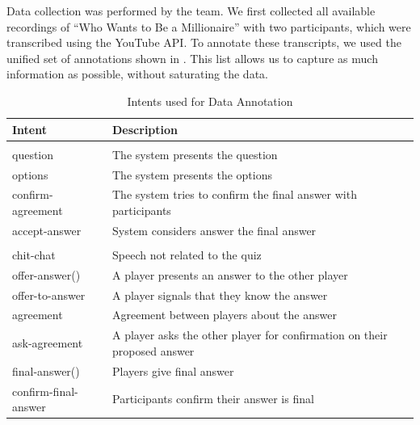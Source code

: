 \documentclass[hidelinks, 11pt]{article}
\begin{document}
Data collection was performed by the team. We first collected all available recordings of ``Who Wants to Be a Millionaire'' with two participants, which were transcribed using the YouTube API. To annotate these transcripts, we used the unified set of annotations shown in . This list allows us to capture as much information as possible, without saturating the data.

\noindent
\begin{table}[h!]
  \begin{tabular}{ | p{2cm} | p{5cm} | }
    \hline
    \rowcolor[HTML]{BFD8EC}
    \textbf{Intent}      & \textbf{Description}                                                     \\
    \hline \hline
    \rowcolor[HTML]{DCE9F6}
    \multicolumn{2}{|c|}{\textit{Host (System) Intents}}                                            \\
    \hline
    question             & The system presents the question                                         \\
    \hline
    options              & The system presents the options                                          \\
    \hline
    confirm-agreement    & The system tries to confirm the final answer with participants           \\
    \hline
    accept-answer        & System considers answer the final answer                                 \\
    \hline \hline
    \rowcolor[HTML]{DCE9F6}
    \multicolumn{2}{|c|}{\textit{User Intents}}                                                     \\
    \hline
    chit-chat            & Speech not related to the quiz                                           \\
    \hline
    offer-answer()       & A player presents an answer to the other player                          \\
    \hline
    offer-to-answer      & A  player signals that they know the answer                              \\
    \hline
    agreement            & Agreement between players about the answer                               \\
    \hline
    ask-agreement        & A player asks the other player for confirmation on their proposed answer \\
    \hline
    final-answer()       & Players give final answer                                                \\
    \hline
    confirm-final-answer & Participants confirm their answer is final                               \\
    \hline
  \end{tabular}
  \caption{Intents used for Data Annotation}
  \label{table:intents}
\end{table}
\end{document}
